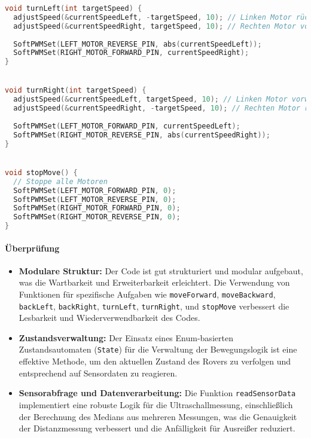 \documentclass{vorlage-design-main}
\begin{document}
\begin{lstlisting}[language={C++}]
void turnLeft(int targetSpeed) {
  adjustSpeed(&currentSpeedLeft, -targetSpeed, 10); // Linken Motor rückwärts für Linksdrehung
  adjustSpeed(&currentSpeedRight, targetSpeed, 10); // Rechten Motor vorwärts
  
  SoftPWMSet(LEFT_MOTOR_REVERSE_PIN, abs(currentSpeedLeft));
  SoftPWMSet(RIGHT_MOTOR_FORWARD_PIN, currentSpeedRight);
}


void turnRight(int targetSpeed) {
  adjustSpeed(&currentSpeedLeft, targetSpeed, 10); // Linken Motor vorwärts für Rechtsdrehung
  adjustSpeed(&currentSpeedRight, -targetSpeed, 10); // Rechten Motor rückwärts
  
  SoftPWMSet(LEFT_MOTOR_FORWARD_PIN, currentSpeedLeft);
  SoftPWMSet(RIGHT_MOTOR_REVERSE_PIN, abs(currentSpeedRight));
}


void stopMove() {
  // Stoppe alle Motoren
  SoftPWMSet(LEFT_MOTOR_FORWARD_PIN, 0);
  SoftPWMSet(LEFT_MOTOR_REVERSE_PIN, 0);
  SoftPWMSet(RIGHT_MOTOR_FORWARD_PIN, 0);
  SoftPWMSet(RIGHT_MOTOR_REVERSE_PIN, 0);
}
\end{lstlisting}

\hypertarget{uxfcberpruxfcfung}{%
\paragraph{Überprüfung}\label{ueberpruefung}}

\begin{itemize}
\item
  \textbf{Modulare Struktur:} Der Code ist gut strukturiert und modular
  aufgebaut, was die Wartbarkeit und Erweiterbarkeit erleichtert. Die
  Verwendung von Funktionen für spezifische Aufgaben wie
  \verb|moveForward|,
  \verb|moveBackward|,
  \verb|backLeft|,
  \verb|backRight|,
  \verb|turnLeft|,
  \verb|turnRight|, und
  \verb|stopMove| verbessert die Lesbarkeit und
  Wiederverwendbarkeit des Codes.
\item
  \textbf{Zustandsverwaltung:} Der Einsatz eines Enum-basierten
  Zustandsautomaten (\verb|State|) für die Verwaltung
  der Bewegungslogik ist eine effektive Methode, um den aktuellen
  Zustand des Rovers zu verfolgen und entsprechend auf Sensordaten zu
  reagieren.
\item
  \textbf{Sensorabfrage und Datenverarbeitung:} Die Funktion
  \verb|readSensorData| implementiert eine robuste
  Logik für die Ultraschallmessung, einschließlich der Berechnung des
  Medians aus mehreren Messungen, was die Genauigkeit der Distanzmessung
  verbessert und die Anfälligkeit für Ausreißer reduziert.
\end{itemize}
\end{document}
